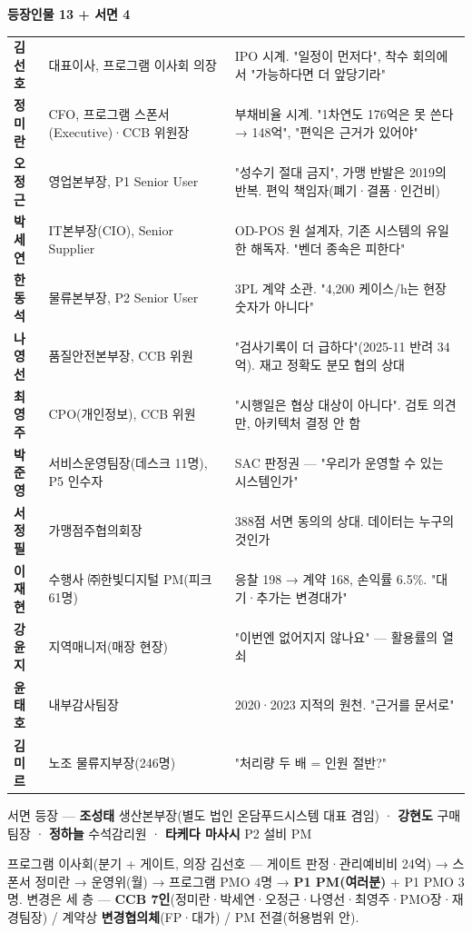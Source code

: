\documentclass[10pt]{article}
\newcommand{\hd}[1]{{\color{navy}\bfseries\large #1}\par\vspace{1pt}{\color{navy}\rule{\linewidth}{0.6pt}}\par\vspace{3pt}}
\begin{document}
\vspace{4pt}
\begin{minipage}[t]{0.56\linewidth}
\hd{등장인물 13 + 서면 4}
\begin{tabularx}{\linewidth}{@{}l l X@{}}
\toprule
\textbf{김선호} & 대표이사, 프로그램 이사회 의장 & IPO 시계. "일정이 먼저다", 착수 회의에서 "가능하다면 더 앞당기라"\\
\textbf{정미란} & CFO, 프로그램 스폰서(Executive)·CCB 위원장 & 부채비율 시계. "1차연도 176억은 못 쓴다 → 148억", "편익은 근거가 있어야"\\
\textbf{오정근} & 영업본부장, P1 Senior User & "성수기 절대 금지", 가맹 반발은 2019의 반복. 편익 책임자(폐기·결품·인건비)\\
\textbf{박세연} & IT본부장(CIO), Senior Supplier & OD-POS 원 설계자, 기존 시스템의 유일한 해독자. "벤더 종속은 피한다"\\
\textbf{한동석} & 물류본부장, P2 Senior User & 3PL 계약 소관. "4,200 케이스/h는 현장 숫자가 아니다"\\
\textbf{나영선} & 품질안전본부장, CCB 위원 & "검사기록이 더 급하다"(2025-11 반려 34억). 재고 정확도 분모 협의 상대\\
\textbf{최영주} & CPO(개인정보), CCB 위원 & "시행일은 협상 대상이 아니다". 검토 의견만, 아키텍처 결정 안 함\\
\textbf{박준영} & 서비스운영팀장(데스크 11명), P5 인수자 & SAC 판정권 — "우리가 운영할 수 있는 시스템인가"\\
\textbf{서정필} & 가맹점주협의회장 & 388점 서면 동의의 상대. 데이터는 누구의 것인가\\
\textbf{이재현} & 수행사 ㈜한빛디지털 PM(피크 61명) & 응찰 198 → 계약 168, 손익률 6.5\%. "대기·추가는 변경대가"\\
\textbf{강윤지} & 지역매니저(매장 현장) & "이번엔 없어지지 않나요" — 활용률의 열쇠\\
\textbf{윤태호} & 내부감사팀장 & 2020·2023 지적의 원천. "근거를 문서로"\\
\textbf{김미르} & 노조 물류지부장(246명) & "처리량 두 배 = 인원 절반?"\\
\bottomrule
\end{tabularx}
{\footnotesize 서면 등장 — \textbf{조성태} 생산본부장(별도 법인 온담푸드시스템 대표 겸임) · \textbf{강현도} 구매팀장 · \textbf{정하늘} 수석감리원 · \textbf{타케다 마사시} P2 설비 PM}

\vspace{5pt}\hd{거버넌스 한 눈에}
프로그램 이사회(분기 + 게이트, 의장 김선호 — 게이트 판정·관리예비비 24억) → 스폰서 정미란 → 운영위(월) → 프로그램 PMO 4명 → \textbf{P1 PM(여러분)} + P1 PMO 3명. 변경은 세 층 — \textbf{CCB 7인}(정미란·박세연·오정근·나영선·최영주·PMO장·재경팀장) / 계약상 \textbf{변경협의체}(FP·대가) / PM 전결(허용범위 안).
\end{minipage}\hfill
\end{document}
